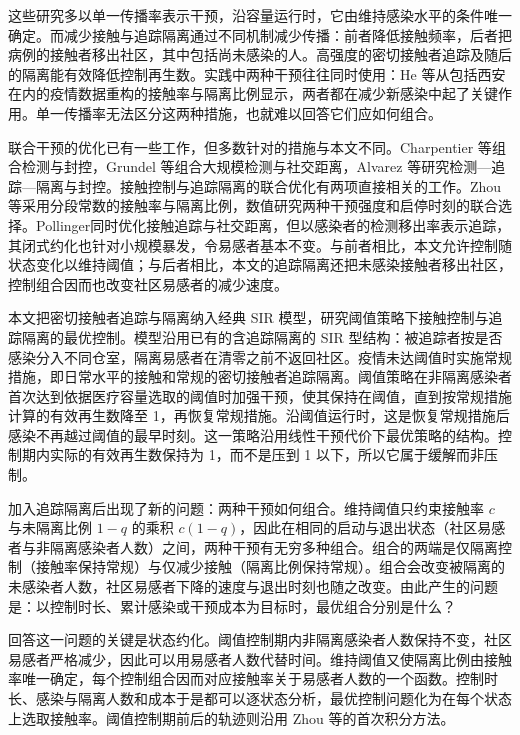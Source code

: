 这些研究多以单一传播率表示干预，沿容量运行时，它由维持感染水平的条件唯一确定。而减少接触与追踪隔离通过不同机制减少传播：前者降低接触频率，后者把病例的接触者移出社区，其中包括尚未感染的人。高强度的密切接触者追踪及随后的隔离能有效降低控制再生数\cite{Tang2020Transmission}。实践中两种干预往往同时使用：He 等\cite{He2023TDINN}从包括西安在内的疫情数据重构的接触率与隔离比例显示，两者都在减少新感染中起了关键作用。单一传播率无法区分这两种措施，也就难以回答它们应如何组合。

联合干预的优化已有一些工作，但多数针对的措施与本文不同。Charpentier 等\cite{Charpentier2020}组合检测与封控，Grundel 等\cite{Grundel2022Testing}组合大规模检测与社交距离，Alvarez 等\cite{Alvarez2021Planning}研究检测—追踪—隔离与封控。接触控制与追踪隔离的联合优化有两项直接相关的工作。Zhou 等\cite{Zhou2024SPCI}采用分段常数的接触率与隔离比例，数值研究两种干预强度和启停时刻的联合选择。Pollinger\cite{Pollinger2023}同时优化接触追踪与社交距离，但以感染者的检测移出率表示追踪，其闭式约化也针对小规模暴发，令易感者基本不变。与前者相比，本文允许控制随状态变化以维持阈值；与后者相比，本文的追踪隔离还把未感染接触者移出社区，控制组合因而也改变社区易感者的减少速度。

本文把密切接触者追踪与隔离纳入经典 SIR 模型，研究阈值策略下接触控制与追踪隔离的最优控制。模型沿用已有的含追踪隔离的 SIR 型结构\cite{Tang2023Threshold,He2023TDINN,Zhou2024SPCI}：被追踪者按是否感染分入不同仓室，隔离易感者在清零之前不返回社区。疫情未达阈值时实施常规措施，即日常水平的接触和常规的密切接触者追踪隔离。阈值策略在非隔离感染者首次达到依据医疗容量选取的阈值时加强干预，使其保持在阈值，直到按常规措施计算的有效再生数降至 1，再恢复常规措施。沿阈值运行时，这是恢复常规措施后感染不再越过阈值的最早时刻。这一策略沿用线性干预代价下最优策略的结构\cite{Miclo2022ICU,Avram2022}。控制期内实际的有效再生数保持为 1，而不是压到 1 以下，所以它属于缓解而非压制。

加入追踪隔离后出现了新的问题：两种干预如何组合。维持阈值只约束接触率 $c$ 与未隔离比例 $1-q$ 的乘积 $c(1-q)$，因此在相同的启动与退出状态（社区易感者与非隔离感染者人数）之间，两种干预有无穷多种组合。组合的两端是仅隔离控制（接触率保持常规）与仅减少接触（隔离比例保持常规）。组合会改变被隔离的未感染者人数，社区易感者下降的速度与退出时刻也随之改变。由此产生的问题是：以控制时长、累计感染或干预成本为目标时，最优组合分别是什么？

回答这一问题的关键是状态约化。阈值控制期内非隔离感染者人数保持不变，社区易感者严格减少，因此可以用易感者人数代替时间。维持阈值又使隔离比例由接触率唯一确定，每个控制组合因而对应接触率关于易感者人数的一个函数。控制时长、感染与隔离人数和成本于是都可以逐状态分析，最优控制问题化为在每个状态上选取接触率。阈值控制期前后的轨迹则沿用 Zhou 等\cite{Zhou2024SPCI}的首次积分方法。

